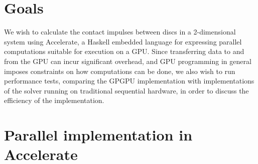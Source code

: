 \documentclass[runningheads,a4paper]{llncs}
\begin{document}
\section{Goals}

We wish to calculate the contact impulses between discs in a 2-dimensional
system using Accelerate, a Haskell embedded language for expressing parallel
computations suitable for execution on a GPU. Since transferring data to and
from the GPU can incur significant overhead, and GPU programming in general
imposes constraints on how computations can be done, we also wish to run
performance tests, comparing the GPGPU implementation with implementations of
the solver running on traditional sequential hardware, in order to discuss the
efficiency of the implementation.
\section{Parallel implementation in Accelerate}
\end{document}
